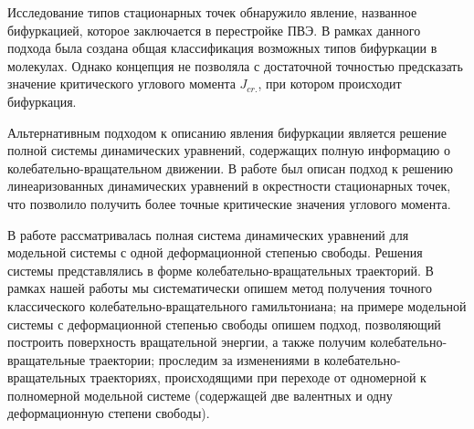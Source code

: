 Исследование типов стационарных точек обнаружило явление, названное бифуркацией, которое заключается в перестройке ПВЭ. В рамках данного подхода была создана общая классификация возможных типов бифуркации в молекулах. Однако концепция не позволяла с достаточной точностью предсказать значение критического углового момента $J_{cr.}$, при котором происходит бифуркация. \par
Альтернативным подходом к описанию явления бифуркации является решение полной системы динамических уравнений, содержащих полную информацию о колебательно-вращательном движении. В работе \cite{koz1996}  был описан подход к решению линеаризованных динамических уравнений в окрестности стационарных точек, что позволило получить более точные критические значения углового момента. \par
В работе \cite{petrov2015} рассматривалась полная система динамических уравнений для модельной системы с одной деформационной степенью свободы. Решения системы представлялись в форме колебательно-вращательных траекторий. В рамках нашей работы мы систематически опишем метод получения точного классического колебательно-вращательного гамильтониана; на примере модельной системы с деформационной степенью свободы опишем подход, позволяющий построить поверхность вращательной энергии, а также получим колебательно-вращательные траектории; проследим за изменениями в колебательно-вращательных траекториях, происходящими при переходе от одномерной к полномерной модельной системе (содержащей две валентных и одну деформационную степени свободы). 